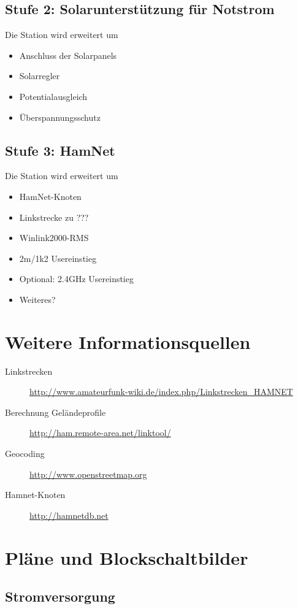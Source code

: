 \documentclass[a4paper]{scrartcl}
\begin{document}
\subsection{Stufe 2: Solarunterst\"utzung f\"ur Notstrom}
Die Station wird erweitert um
\begin{itemize}
    \item Anschluss der Solarpanels
    \item Solarregler
    \item Potentialausgleich
    \item \"Uberspannungsschutz
\end{itemize}

\subsection{Stufe 3: HamNet}
Die Station wird erweitert um
\begin{itemize}
    \item HamNet-Knoten
    \item Linkstrecke zu ???
    \item Winlink2000-RMS
    \item 2m/1k2 Usereinstieg
    \item Optional: 2.4GHz Usereinstieg
    \item Weiteres?
\end{itemize}

\section{Weitere Informationsquellen}
\begin{description}
    \item[Linkstrecken] \url{http://www.amateurfunk-wiki.de/index.php/Linkstrecken_HAMNET}
    \item[Berechnung Gel\"andeprofile] \url{http://ham.remote-area.net/linktool/}
    \item[Geocoding] \url{http://www.openstreetmap.org}
    \item[Hamnet-Knoten] \url{http://hamnetdb.net}
\end{description}


\appendix


\section{Pl\"ane und Blockschaltbilder}
\subsection{Stromversorgung}
\end{document}
